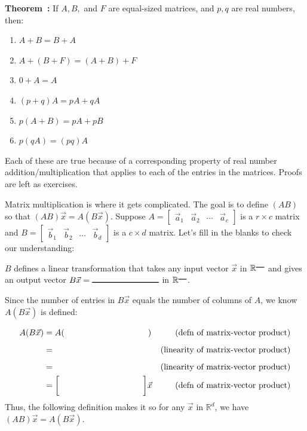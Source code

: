 \documentclass[11pt, letterpaper]{report}
\newenvironment{notes}{}{}
\let\originalleft\left
\let\originalright\right
\renewcommand{\left}{\mathopen{}\mathclose\bgroup\originalleft}
\renewcommand{\right}{\aftergroup\egroup\originalright}
\newcounter{exercise}[section]
\newcounter{theorem}[chapter]
\newenvironment{theorem}[1][]{\refstepcounter{theorem}\begin{bbox}\par
    \noindent\textbf{Theorem~\thetheorem: #1}}{\end{bbox}}
\newlength\oldfboxsep%
\newlength\myminiwidth%
\newenvironment{bbox}{%
  \setlength\oldfboxsep\fboxsep
  \setlength{\fboxsep}{.1in}%
  \setlength\myminiwidth\linewidth%
  \addtolength\myminiwidth{-0.2in}%
  \vspace{0.1in}%
  \begin{lrbox}{\bboxbox}\begin{minipage}{\myminiwidth}%
    }{%
    \end{minipage}\end{lrbox}%
  \noindent\fbox{\usebox{\bboxbox}}\vspace{0.1in}\setlength\fboxsep\oldfboxsep%
}
\newcommand{\R}{\mathbb{R}}
\begin{document}
\begin{theorem}
\label{theorem:matrix-addition-scaling}
If $A,B,$ and $F$ are equal-sized matrices, and $p,q$ are real numbers, then:
\begin{enumerate}[label=(\roman*)]
\item $A+B = B+A$
\item $A + (B+F) = (A+B) +F$
\item $0 + A = A$
\item $(p+q)A = pA + qA$
\item $p(A+B) = pA+pB$
\item $p(qA) = (pq)A$
\end{enumerate}
\end{theorem}

Each of these are true because of a corresponding property of real number addition/multiplication that applies to each of the entries in the matrices. Proofs are left as exercises.

\begin{notes}
Matrix multiplication is where it gets complicated. The goal is to define $(AB)$ so that $(AB)\vec{x} = A(B\vec{x})$. Suppose $A =\begin{bmatrix}
\vec{a}_1 & \vec{a}_2 & \cdots & \vec{a}_c
\end{bmatrix}$ is a $r \times c$ matrix and $B =\begin{bmatrix}
\vec{b}_1 & \vec{b}_2 & \cdots & \vec{b}_{d}
\end{bmatrix}$ is a $c \times d$ matrix. Let's fill in the blanks to check our understanding:

$B$ defines a linear transformation that takes any input vector $\vec{x}$ in $\R^{\rule{1em}{0.8pt}}$ and gives an output vector $B\vec{x} = \rule{8em}{0.8pt}$ in $\R^{\rule{1em}{0.8pt}}$.

Since the number of entries in $B\vec{x}$ equals the number of columns of $A$, we know $A(B\vec{x})$ is defined:
\begin{align*}
A(B\vec{x}) &= A(\rule{10em}{0pt}\rule{0pt}{1.3em}) &(\text{defn of matrix-vector product}) \\
&= \rule{10em}{0pt}\rule{0pt}{1.3em} &(\text{linearity of matrix-vector product}) \\
&= \rule{10em}{0pt}\rule{0pt}{1.3em} &(\text{linearity of matrix-vector product}) \\
&= \left[\rule{10em}{0pt}\rule{0pt}{1.3em}\right]\vec{x} &(\text{defn of matrix-vector product})
\end{align*}
Thus, the following definition makes it so for any $\vec{x}$ in $\R^d$, we have $(AB)\vec{x} = A(B\vec{x})$.
\end{notes}
\end{document}
